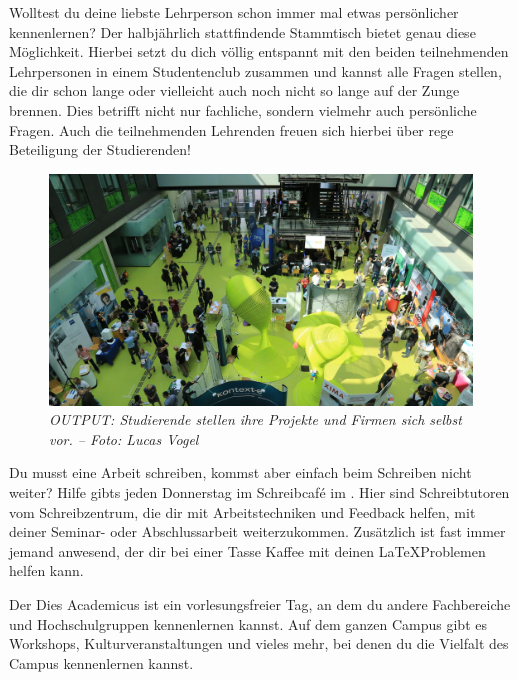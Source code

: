 
Wolltest du deine liebste Lehrperson schon immer mal etwas persönlicher kennenlernen? Der halbjährlich stattfindende Stammtisch bietet genau diese Möglichkeit. Hierbei setzt du dich völlig entspannt mit den beiden teilnehmenden Lehrpersonen in einem Studentenclub zusammen und kannst alle Fragen stellen, die dir schon lange oder vielleicht auch noch nicht so lange auf der Zunge brennen. Dies betrifft nicht nur fachliche, sondern vielmehr auch persönliche Fragen. Auch die teilnehmenden Lehrenden freuen sich hierbei über rege Beteiligung der Studierenden!

\begin{figure}[b!]
	\centering
  \includegraphics[width=.95\linewidth,keepaspectratio]{img/output}
  \caption*{\small \centering \textit{OUTPUT\@: Studierende stellen ihre Projekte und Firmen sich selbst vor. -- Foto: Lucas Vogel}}
\end{figure}%


Du musst eine Arbeit schreiben, kommst aber einfach beim Schreiben nicht weiter? Hilfe gibts jeden Donnerstag im Schreibcaf\'e im \ascii. Hier sind Schreibtutoren vom Schreibzentrum, die dir mit Arbeitstechniken und Feedback helfen, mit deiner Seminar- oder Abschlussarbeit weiterzukommen. Zusätzlich ist fast immer jemand anwesend, der dir bei einer Tasse Kaffee mit deinen \LaTeX Problemen helfen kann.



Der Dies Academicus ist ein vorlesungsfreier Tag, an dem du andere Fachbereiche und Hochschulgruppen kennenlernen kannst. Auf dem ganzen Campus gibt es Workshops, Kulturveranstaltungen und vieles mehr, bei denen du die Vielfalt des Campus kennenlernen kannst.

\pagebreak

